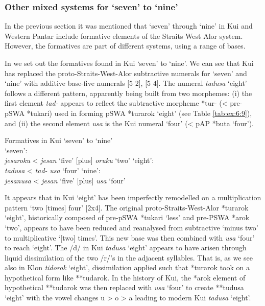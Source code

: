 \subsubsection{Other mixed systems for `seven' to `nine'}\label{sec:6:5.2.3}
In the previous section it was mentioned that `seven' through `nine' in Kui and Western Pantar include formative elements of the Straits West Alor system. However, the formatives are part of different systems, using a range of bases.

In  we set out the formatives found in Kui `seven' to `nine'. We can see that Kui has replaced the proto-Straits-West-Alor subtractive numerals for `seven' and `nine' with additive base-five numerals [5 2], [5 4]. The numeral \textit{tadusa} `eight' follows a different pattern, apparently being built from two morphemes: (i) the first element \textit{tad-} appears to reflect the subtractive morpheme *tur- ({\textless} pre-pSWA *tukari) used in forming pSWA *turarok `eight' (see Table \ref{tab:ex:6:9}), and (ii) the second element \textit{usa} is the Kui numeral `four' ({\textless} pAP *buta `four'). 

 

\ea%
\label{ex:6:10}
\upshape Formatives in Kui `seven' to `nine'\\
\ea \upshape  `seven': \\
\textit{j}\textit{esaroku}  {\textless}  \textit{jesan} `five'   [plus]  \textit{oruku} `two'
\ex \upshape  `eight':\\
\textit{tadusa}    {\textless}  \textit{tad-}      \textit{usa} `four'
\ex \upshape  `nine':\\
\textit{je}\textit{sanusa}  {\textless}    \textit{jesan} `five'  [plus]  \textit{usa} `four'
\z
\z

It appears that in Kui `eight' has been imperfectly remodelled on a multiplication pattern `two [times] four' [2x4]. The original proto-Straits-West-Alor *turarok `eight', historically composed of pre-pSWA *tukari `less' and pre-PSWA *arok `two', appears to have been reduced and reanalysed from subtractive `minus two' to multiplicative `[two] times'. This new base was then combined with \textit{usa} `four' to reach `eight'. The /d/ in Kui \textit{tadusa} `eight' appears to have arisen through liquid dissimilation of the two /r/'s in the adjacent syllables. That is, as we see also in Klon \textit{tidorok} `eight', dissimilation applied such that *turarok took on a hypothetical form like **tudarok. In the history of Kui, the *arok element of hypothetical **tudarok was then replaced with \textit{usa} `four' to create **tudusa `eight' with the vowel changes u {\textgreater} o {\textgreater} a leading to modern Kui \textit{tadusa} `eight'.

